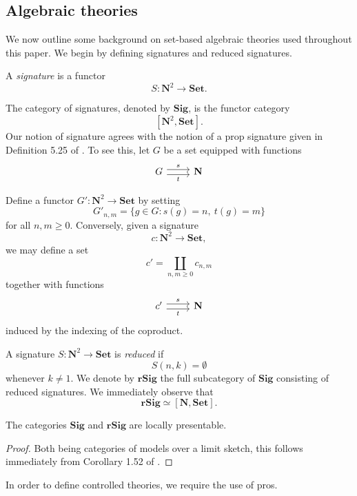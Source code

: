 \documentclass{tac}
\begin{document}
\subsection*{Algebraic theories}

We now outline some background on set-based algebraic theories used throughout this paper. We begin by defining signatures and reduced signatures.

\begin{definition}
A \emph{signature} is a functor
\[
S:\mathbf{N}^{2}\to \mathbf{Set}.
\]
\end{definition}

The category of signatures, denoted by $\mathbf{Sig}$, is the functor category
\[
[\mathbf{N}^{2},\mathbf{Set}].
\]
Our notion of signature agrees with the notion of a prop signature given in Definition 5.25 of \cite{FongSpivak2019}. To see this, let $G$ be a set equipped with functions
\[
\begin{tikzcd}
G
  \arrow[r, shift left=0.6ex, "s"]
  \arrow[r, shift right=0.6ex, swap, "t"]
&
\mathbf{N}
\end{tikzcd}
\]


Define a functor $G':\mathbf{N}^{2}\to\mathbf{Set}$ by setting
\[
G'_{n,m}=\{g\in G:s(g)=n,\ t(g)=m\}
\]
for all $n,m\geq 0$. Conversely, given a signature
\[
c:\mathbf{N}^{2}\to\mathbf{Set},
\]
we may define a set
\[
c'=\coprod_{n,m\geq 0}c_{n,m}
\]
together with functions
\[
\begin{tikzcd}
c'
  \arrow[r, shift left=0.6ex, "s"]
  \arrow[r, shift right=0.6ex, swap, "t"]
&
\mathbf{N}
\end{tikzcd}
\]
induced by the indexing of the coproduct.

A signature $S:\mathbf{N}^{2}\to\mathbf{Set}$ is \emph{reduced} if
\[
S(n,k)=\emptyset
\]
whenever $k\neq 1$. We denote by $\mathbf{rSig}$ the full subcategory of $\mathbf{Sig}$ consisting of reduced signatures. We immediately observe that
\[
\mathbf{rSig}\simeq [\mathbf{N},\mathbf{Set}].
\]

\begin{lemma}
The categories $\mathbf{Sig}$ and $\mathbf{rSig}$ are locally presentable.
\end{lemma}

\begin{proof}
Both being categories of models over a limit sketch, this follows immediately from Corollary 1.52 of \cite{AdRo}.
\end{proof}

In order to define controlled theories, we require the use of pros.
\end{document}
